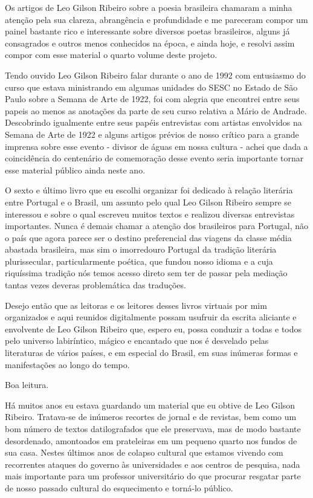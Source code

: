 \documentclass[
  a4paper,
  oneside]{scrbook}
\renewcommand*\contentsname{Índice}
\newcommand\contentsname{Índice}
\begin{document}
Os artigos de Leo Gilson Ribeiro sobre a poesia brasileira chamaram a
minha atenção pela sua clareza, abrangência e profundidade e me
pareceram compor um painel bastante rico e interessante sobre diversos
poetas brasileiros, alguns já consagrados e outros menos conhecidos na
época, e ainda hoje, e resolvi assim compor com esse material o quarto
volume deste projeto.

Tendo ouvido Leo Gilson Ribeiro falar durante o ano de 1992 com
entusiasmo do curso que estava ministrando em algumas unidades do SESC
no Estado de São Paulo sobre a Semana de Arte de 1922, foi com alegria
que encontrei entre seus papeis ao menos as anotações da parte de seu
curso relativa a Mário de Andrade. Descobrindo igualmente entre seus
papéis entrevistas com artistas envolvidos na Semana de Arte de 1922 e
alguns artigos prévios de nosso crítico para a grande imprensa sobre
esse evento - divisor de águas em nossa cultura - achei que dada a
coincidência do centenário de comemoração desse evento seria importante
tornar esse material público ainda neste ano.

O sexto e último livro que eu escolhi organizar foi dedicado à relação
literária entre Portugal e o Brasil, um assunto pelo qual Leo Gilson
Ribeiro sempre se interessou e sobre o qual escreveu muitos textos e
realizou diversas entrevistas importantes. Nunca é demais chamar a
atenção dos brasileiros para Portugal, não o país que agora parece ser o
destino preferencial das viagens da classe média abastada brasileira,
mas sim o imorredouro Portugal da tradição literária plurissecular,
particularmente poética, que fundou nosso idioma e a cuja riquíssima
tradição nós temos acesso direto sem ter de passar pela mediação tantas
vezes deveras problemática das traduções.

Desejo então que as leitoras e os leitores desses livros virtuais por
mim organizados e aqui reunidos digitalmente possam usufruir da escrita
aliciante e envolvente de Leo Gilson Ribeiro que, espero eu, possa
conduzir a todas e todos pelo universo labiríntico, mágico e encantado
que nos é desvelado pelas literaturas de vários países, e em especial do
Brasil, em suas inúmeras formas e manifestações ao longo do tempo.

Boa leitura.

\cleardoublepage
\renewcommand*\contentsname{Índice}
{
\setcounter{tocdepth}{0}
\tableofcontents
}
Há muitos anos eu estava guardando um material que eu obtive de Leo
Gilson Ribeiro. Tratava-se de inúmeros recortes de jornal e de revistas,
bem como um bom número de textos datilografados que ele preservava, mas
de modo bastante desordenado, amontoados em prateleiras em um pequeno
quarto nos fundos de sua casa. Nestes últimos anos de colapso cultural
que estamos vivendo com recorrentes ataques do governo às universidades
e aos centros de pesquisa, nada mais importante para um professor
universitário do que procurar resgatar parte de nosso passado cultural
do esquecimento e torná-lo público.
\end{document}
